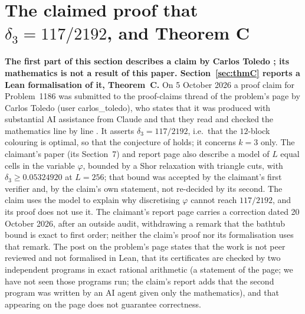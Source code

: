 \documentclass[11pt]{amsart}
\theoremstyle{remark}
\begin{document}
\section{The claimed proof that $\delta_3=117/2192$, and Theorem C}\label{sec:claim}
\textbf{The first part of this section describes a claim by Carlos Toledo \cite{Toledo26}; its mathematics is not a result of this paper. Section~\ref{sec:thmC} reports a Lean formalisation of it, Theorem~C.} On 5 October 2026 a proof claim for Problem~1186 was submitted to the proof-claims thread of the problem's page \cite{EP1186} by Carlos Toledo (user carlos\_toledo), who states that it was produced with substantial AI assistance from Claude and that they read and checked the mathematics line by line \cite{Toledo26}. It asserts
$\delta_3=117/2192$, i.e.\ that the $12$-block colouring is optimal, so that the conjecture of \cite{PRS08} holds; it concerns $k=3$ only. The claimant's paper (its Section~7) and report page also describe a model of $L$ equal cells in the variable $\varphi$, bounded by a Shor relaxation with triangle cuts, with $\delta_3\ge0.05324920$ at $L=256$; that bound was accepted by the claimant's first verifier and, by the claim's own statement, not re-decided by its second. The claim uses the model to explain why discretising $\varphi$ cannot reach $117/2192$, and its proof does not use it. The claimant's report page carries a correction dated 20 October 2026, after an outside audit, withdrawing a remark that the bathtub bound is exact to first order; neither the claim's proof nor its formalisation uses that remark. The post on the problem's page states that the work is not peer reviewed and not formalised in Lean, that its certificates are checked by two independent
programs in exact rational arithmetic (a statement of the page; we have not seen those programs run; the claim's report adds that the second program was written by an AI agent given only the mathematics), and that appearing on the page does not guarantee correctness.
\end{document}
